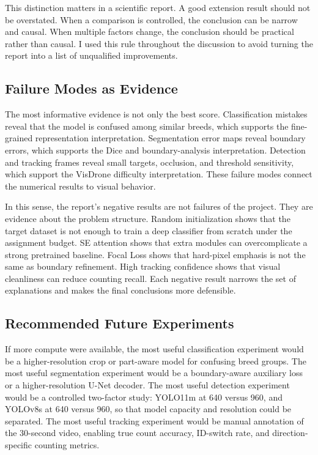 \documentclass[10pt,twocolumn]{article}
\begin{document}
This distinction matters in a scientific report. A good extension result should not be overstated. When a comparison is controlled, the conclusion can be narrow and causal. When multiple factors change, the conclusion should be practical rather than causal. I used this rule throughout the discussion to avoid turning the report into a list of unqualified improvements.

\subsection{Failure Modes as Evidence}

The most informative evidence is not only the best score. Classification mistakes reveal that the model is confused among similar breeds, which supports the fine-grained representation interpretation. Segmentation error maps reveal boundary errors, which supports the Dice and boundary-analysis interpretation. Detection and tracking frames reveal small targets, occlusion, and threshold sensitivity, which support the VisDrone difficulty interpretation. These failure modes connect the numerical results to visual behavior.

In this sense, the report's negative results are not failures of the project. They are evidence about the problem structure. Random initialization shows that the target dataset is not enough to train a deep classifier from scratch under the assignment budget. SE attention shows that extra modules can overcomplicate a strong pretrained baseline. Focal Loss shows that hard-pixel emphasis is not the same as boundary refinement. High tracking confidence shows that visual cleanliness can reduce counting recall. Each negative result narrows the set of explanations and makes the final conclusions more defensible.

\subsection{Recommended Future Experiments}

If more compute were available, the most useful classification experiment would be a higher-resolution crop or part-aware model for confusing breed groups. The most useful segmentation experiment would be a boundary-aware auxiliary loss or a higher-resolution U-Net decoder. The most useful detection experiment would be a controlled two-factor study: YOLO11m at 640 versus 960, and YOLOv8s at 640 versus 960, so that model capacity and resolution could be separated. The most useful tracking experiment would be manual annotation of the 30-second video, enabling true count accuracy, ID-switch rate, and direction-specific counting metrics.
\end{document}
